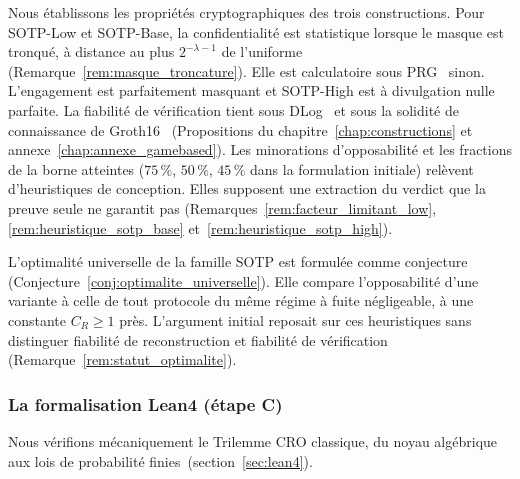 \begin{sloppypar}
Nous \'etablissons les propri\'et\'es cryptographiques des trois
constructions. Pour SOTP-Low et SOTP-Base, la confidentialit\'e est statistique lorsque le masque est
tronqu\'e, \`a distance au plus $2^{-\lambda-1}$ de l'uniforme
(Remarque~\ref{rem:masque_troncature}). Elle est calculatoire
sous PRG~\cite{GoldreichKrawczyk99,BlumMicali84} sinon. L'engagement est parfaitement masquant et
SOTP-High est \`a divulgation nulle parfaite.
La fiabilit\'e de v\'erification tient sous DLog~\cite{Pedersen91} et sous
la solidit\'e de connaissance de Groth16~\cite{Groth16,FKL18} (Propositions du chapitre~\ref{chap:constructions}
et annexe~\ref{chap:annexe_gamebased}). Les minorations d'opposabilit\'e et les
fractions de la borne atteintes (\og $75\,\%$, $50\,\%$, $45\,\%$\fg{} dans la
formulation initiale) rel\`event d'heuristiques de conception. Elles supposent une extraction du verdict que la preuve seule ne
garantit pas (Remarques~\ref{rem:facteur_limitant_low},
\ref{rem:heuristique_sotp_base} et~\ref{rem:heuristique_sotp_high}).
\label{eq:saturation_resultat}

L'optimalit\'e universelle de la famille SOTP est formul\'ee comme conjecture
(Conjecture~\ref{conj:optimalite_universelle}). Elle compare l'opposabilit\'e d'une variante \`a celle de
tout protocole du m\^eme r\'egime \`a fuite n\'egligeable, \`a une constante $C_R \geq 1$ pr\`es. L'argument initial reposait sur
ces heuristiques sans distinguer fiabilit\'e de reconstruction et fiabilit\'e
de v\'erification (Remarque~\ref{rem:statut_optimalite}).
\label{eq:optimalite_resultat}

\subsubsection{La formalisation Lean4 (\'etape C)}
\label{subsubsec:resultats_etape_C}

Nous v\'erifions m\'ecaniquement le Trilemme CRO classique, du noyau alg\'ebrique aux
lois de probabilit\'e finies~(section~\ref{sec:lean4}).


\end{sloppypar}
